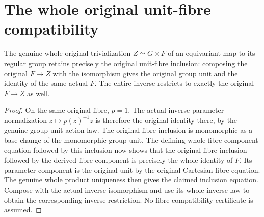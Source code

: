 \section{The whole original unit-fibre compatibility}
\label{sec:equivariant-group-fibre-inclusion}

\begin{theorem}
\label{thm:equivariant-group-fibre-inclusion}
\leanok
{}
The genuine whole original trivialization $Z\simeq G\times F$
of an equivariant map to its regular group retains precisely
the original unit-fibre inclusion: composing the original
$F\to Z$ with the isomorphism gives the original group unit
and the identity of the same actual $F$. The entire inverse
restricts to exactly the original $F\to Z$ as well.
\end{theorem}

\begin{proof}
On the same original fibre, $p=1$. The actual inverse-parameter
normalization $z\mapsto p(z)^{-1}z$ is therefore the original
identity there, by the genuine group unit action law.
The original fibre inclusion is monomorphic as a base
change of the monomorphic group unit. The defining whole
fibre-component equation followed by this inclusion now
shows that the original fibre inclusion followed by the
derived fibre component is precisely the whole identity
of $F$. Its parameter component is the original unit by
the original Cartesian fibre equation. The genuine whole
product uniqueness then gives the claimed inclusion equation.
Compose with the actual inverse isomorphism and use its
whole inverse law to obtain the corresponding inverse
restriction. No fibre-compatibility certificate is assumed.
\end{proof}
